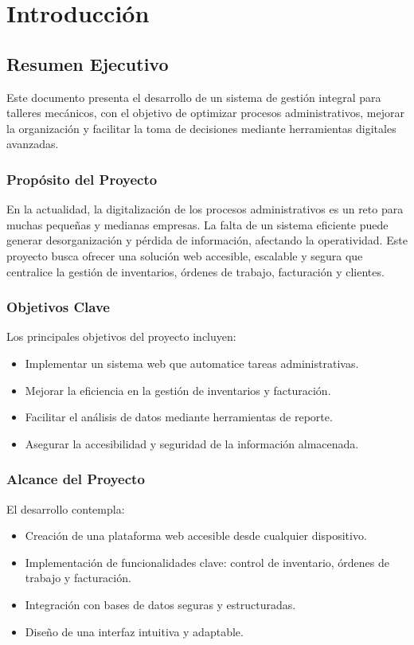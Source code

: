 \chapter{Introducción}

\section{Resumen Ejecutivo}


Este documento presenta el desarrollo de un sistema de gestión integral para talleres mecánicos, con el objetivo de optimizar procesos administrativos, mejorar la organización y facilitar la toma de decisiones mediante herramientas digitales avanzadas.

\subsection{Propósito del Proyecto}
En la actualidad, la digitalización de los procesos administrativos es un reto para muchas pequeñas y medianas empresas. La falta de un sistema eficiente puede generar desorganización y pérdida de información, afectando la operatividad. Este proyecto busca ofrecer una solución web accesible, escalable y segura que centralice la gestión de inventarios, órdenes de trabajo, facturación y clientes.

\subsection{Objetivos Clave}
Los principales objetivos del proyecto incluyen:
\begin{itemize}
	\item Implementar un sistema web que automatice tareas administrativas.
	\item Mejorar la eficiencia en la gestión de inventarios y facturación.
	\item Facilitar el análisis de datos mediante herramientas de reporte.
	\item Asegurar la accesibilidad y seguridad de la información almacenada.
\end{itemize}

\subsection{Alcance del Proyecto}
El desarrollo contempla:
\begin{itemize}
	\item Creación de una plataforma web accesible desde cualquier dispositivo.
	\item Implementación de funcionalidades clave: control de inventario, órdenes de trabajo y facturación.
	\item Integración con bases de datos seguras y estructuradas.
	\item Diseño de una interfaz intuitiva y adaptable.
\end{itemize}

